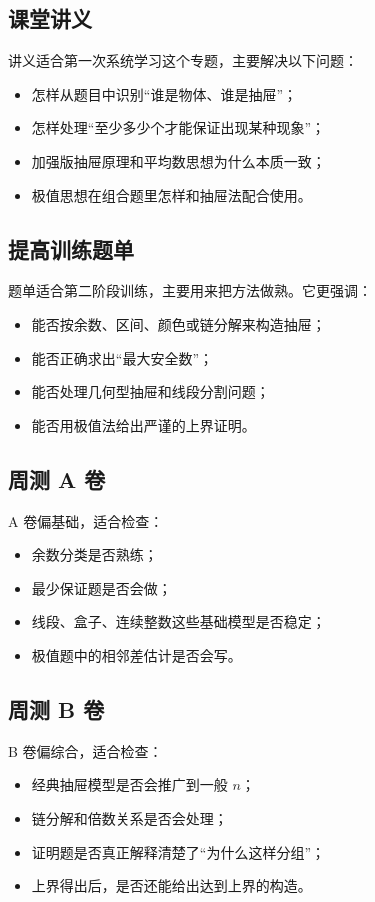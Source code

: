 \documentclass[11pt,a4paper,fontset=fandol]{ctexart}
\begin{document}
\subsection{课堂讲义}
讲义适合第一次系统学习这个专题，主要解决以下问题：
\begin{itemize}
  \item 怎样从题目中识别“谁是物体、谁是抽屉”；
  \item 怎样处理“至少多少个才能保证出现某种现象”；
  \item 加强版抽屉原理和平均数思想为什么本质一致；
  \item 极值思想在组合题里怎样和抽屉法配合使用。
\end{itemize}

\subsection{提高训练题单}
题单适合第二阶段训练，主要用来把方法做熟。它更强调：
\begin{itemize}
  \item 能否按余数、区间、颜色或链分解来构造抽屉；
  \item 能否正确求出“最大安全数”；
  \item 能否处理几何型抽屉和线段分割问题；
  \item 能否用极值法给出严谨的上界证明。
\end{itemize}

\subsection{周测 A 卷}
A 卷偏基础，适合检查：
\begin{itemize}
  \item 余数分类是否熟练；
  \item 最少保证题是否会做；
  \item 线段、盒子、连续整数这些基础模型是否稳定；
  \item 极值题中的相邻差估计是否会写。
\end{itemize}

\subsection{周测 B 卷}
B 卷偏综合，适合检查：
\begin{itemize}
  \item 经典抽屉模型是否会推广到一般 $n$；
  \item 链分解和倍数关系是否会处理；
  \item 证明题是否真正解释清楚了“为什么这样分组”；
  \item 上界得出后，是否还能给出达到上界的构造。
\end{itemize}
\end{document}
